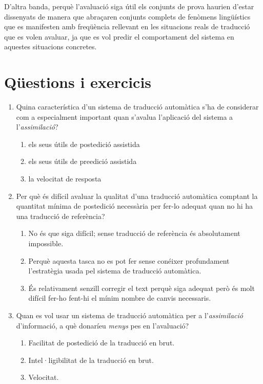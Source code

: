 D'altra banda, perquè l'avaluació siga útil els conjunts de prova
haurien d'estar dissenyats de manera que abraçaren conjunts complets
de fenòmens lingüístics que es manifesten amb freqüència rellevant en
les situacions reals de traducció que es volen avaluar, ja que es vol
predir el comportament del sistema en aquestes situacions concretes.


\section{Qüestions i exercicis}

\begin{enumerate}
\item Quina característica d'un sistema de traducció automàtica
   s'ha de considerar com a especialment important quan s'avalua
   l'aplicació del sistema a l'\emph{assimilació}?
   
\begin{enumerate}
\item els seus útils de postedició assistida
\item els seus útils de preedició assistida
\item la velocitat de resposta
\end{enumerate}

\item Per què és difícil avaluar la qualitat d'una traducció automàtica
   comptant la quantitat mínima de postedició necessària per fer-lo adequat
   quan no hi ha una traducció de referència?
   
\begin{enumerate}
\item No és que siga difícil; sense
      traducció de referència és absolutament impossible.
\item Perquè aquesta tasca no es pot fer sense conéixer
      profundament l'estratègia usada pel sistema de traducció
      automàtica.
\item És relativament senzill corregir el text perquè
      siga adequat però és molt difícil fer-ho fent-hi el mínim nombre
      de canvis necessaris.
\end{enumerate}

\item Quan es vol usar un sistema de traducció automàtica per a
  l'\emph{assimilació} d'informació, a què donaríeu \emph{menys} pes
  en l'avaluació?
   
\begin{enumerate}
\item Facilitat de postedició de la traducció en brut.
\item Intel·ligibilitat de la traducció en brut.
\item Velocitat.
\end{enumerate}



\end{enumerate}

